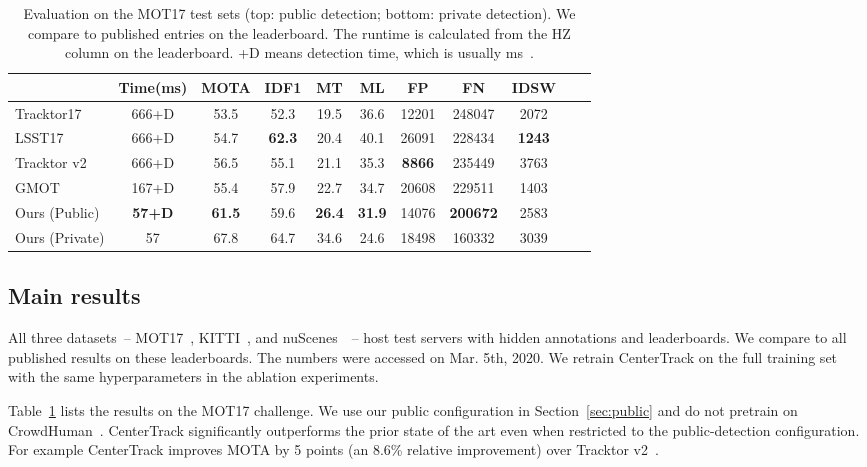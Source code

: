 \documentclass[runningheads]{llncs}
\newcommand{\lblsec}[1]{\label{sec:#1}}
\newcommand{\lbltab}[1]{\label{tbl:#1}}
\newcommand{\refsec}[1]{Section~\ref{sec:#1}}
\newcommand{\reftab}[1]{Table~\ref{tbl:#1}}
\begin{document}
\begin{table}[t]
\center 
\footnotesize
\begin{tabular}{@{}l@{\ \ }c@{\ \ } c@{\ \ } c@{\ \ } c@{\ \ } c@{\ \ } c@{\ \ } c@{\ \ } c@{\ \ } c@{\ \ } c@{}}
\toprule
 & Time(ms) & MOTA  & IDF1  & MT  & ML  & FP  & FN  & IDSW \\
\midrule
Tracktor17~\cite{bergmann2019tracking} & 666+D & 53.5 & 52.3 & 19.5 & 36.6 & 12201 & 248047 & 2072 \\
LSST17~\cite{feng2019multi} & 666+D & 54.7 & \textbf{62.3}   & 20.4 & 40.1 & 26091 & 228434 & \textbf{1243} \\
Tracktor v2~\cite{bergmann2019tracking} & 666+D & 56.5 & 55.1   & 21.1 & 35.3 & \textbf{8866} & 235449 & 3763 \\
{GMOT} & {167+D} & {55.4} & {57.9}  & {22.7} & {34.7} & {20608} & {229511} & {1403} \\	
Ours (Public) & \textbf{57+D} & \textbf{61.5} & 59.6 & \textbf{26.4} & \textbf{31.9} & 14076 & \textbf{200672} & 2583\\
\midrule
Ours (Private) & 57 & 67.8 & 64.7 & 34.6 & 24.6 & 18498 & 160332 & 3039 \\
\bottomrule
\end{tabular}
\caption{Evaluation on the MOT17 test sets (top: public detection; bottom: private detection). We compare to published entries on the leaderboard. The runtime is calculated from the {HZ} column on the leaderboard. +D means detection time, which is usually ms~\cite{ren2015faster}.}
\lbltab{MOT}
\vspace{-7mm}
\end{table}


\subsection{Main results}
\lblsec{results}

All three datasets~-- MOT17~\cite{MOT16}, KITTI~\cite{Geiger2012CVPR}, and nuScenes~\cite{nuscenes2019}~-- host test servers with hidden annotations and leaderboards.
We compare to all published results on these leaderboards.
The numbers were accessed on Mar. 5th, 2020.
We retrain CenterTrack on the full training set with the same hyperparameters in the ablation experiments.

\reftab{MOT} lists the results on the MOT17 challenge.
We use our public configuration in \refsec{public} and do not pretrain on CrowdHuman~\cite{shao2018crowdhuman}.
CenterTrack significantly outperforms the prior state of the art even when restricted to the public-detection configuration. For example CenterTrack improves MOTA by 5 points (an 8.6\% relative improvement) over Tracktor v2~\cite{bergmann2019tracking}.
\end{document}
